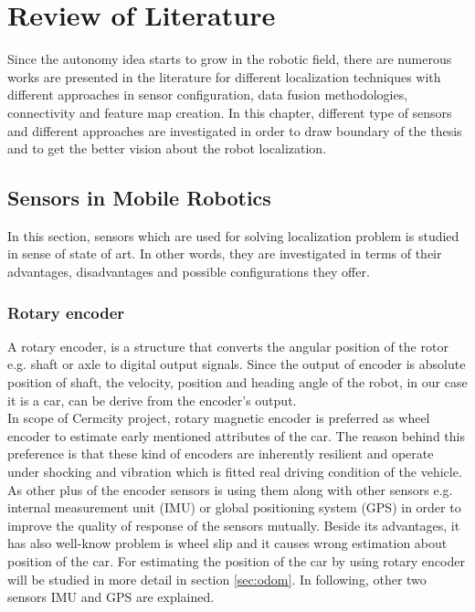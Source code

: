 \chapter{Review of Literature}

Since the autonomy idea starts to grow in the robotic field, 
there are numerous works are presented in the literature for 
different localization techniques with different approaches 
in sensor configuration, data fusion methodologies, connectivity 
and feature map creation. In this chapter, different type of sensors
and different approaches are investigated in order to draw boundary of 
the thesis and to get the better vision about the robot localization.

\section{Sensors in Mobile Robotics}
In this section, sensors which are used for solving localization problem is studied in sense of state of art. In other words, they are investigated in terms of their advantages, disadvantages and possible configurations they offer.

\subsection{Rotary encoder}
A rotary encoder, is a structure that converts the angular position of the rotor e.g. shaft or axle to digital output signals. Since the output of encoder is absolute position of shaft, the velocity, position and heading angle of the robot, in our case it is a car, can be derive from the encoder's output. 
\\ In scope of Cermcity project, rotary magnetic encoder is preferred as wheel encoder to estimate early mentioned attributes of the car. The reason behind this preference is that these kind of encoders are inherently resilient and operate under shocking and vibration which is fitted real driving condition of the vehicle. As other plus of the encoder sensors is using them along with other sensors e.g. internal measurement unit (IMU) or global positioning system (GPS) in order to improve the quality of response of the sensors mutually. Beside its advantages, it has also well-know problem is wheel slip and it causes wrong estimation about position of the car. For estimating the position of the car by using rotary encoder will be studied in more detail in section \ref{sec:odom}. In following, other two sensors IMU and GPS are explained.  %

